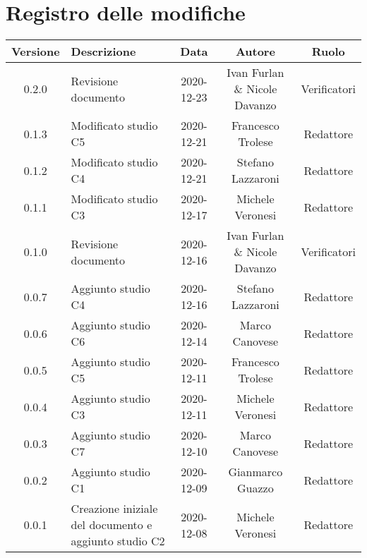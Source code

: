 \section*{Registro delle modifiche}

\begin{center}
	\begin{longtable}{|c|p{5cm}|c|c|c|}
	\hline
	\rowcolor{lighter-grayer}
	\textbf{Versione} & \textbf{Descrizione} & \textbf{Data} & \textbf{Autore} & \textbf{Ruolo} \\
	\hline
	\endfirsthead

	\hline
	0.2.0 & Revisione documento & 2020-12-23 & Ivan Furlan \& Nicole Davanzo & Verificatori \\
	0.1.3 & Modificato studio C5 & 2020-12-21 & Francesco Trolese & Redattore \\
	0.1.2 & Modificato studio C4 & 2020-12-21 & Stefano Lazzaroni & Redattore \\
	0.1.1 & Modificato studio C3 & 2020-12-17 & Michele Veronesi & Redattore \\
	0.1.0 & Revisione documento & 2020-12-16 & Ivan Furlan \& Nicole Davanzo & Verificatori \\
	0.0.7 & Aggiunto studio C4 & 2020-12-16 & Stefano Lazzaroni & Redattore \\
	0.0.6 & Aggiunto studio C6 & 2020-12-14 & Marco Canovese & Redattore \\
	0.0.5 & Aggiunto studio C5 & 2020-12-11 & Francesco Trolese & Redattore \\
	0.0.4 & Aggiunto studio C3 & 2020-12-11 & Michele Veronesi & Redattore \\
	0.0.3 & Aggiunto studio C7 & 2020-12-10 & Marco Canovese & Redattore \\
	0.0.2 & Aggiunto studio C1 & 2020-12-09 & Gianmarco Guazzo & Redattore\\
    0.0.1 & Creazione iniziale del documento e aggiunto studio C2 & 2020-12-08 & Michele Veronesi & Redattore\\
	\hline

	\end{longtable}
\end{center}

